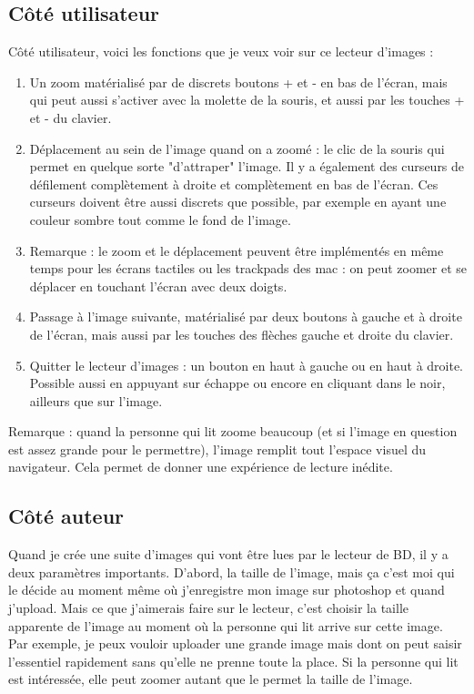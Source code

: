 \documentclass[french]{report}
\theoremstyle{plain}
\begin{document}
		\subsection{Côté utilisateur}
			Côté utilisateur, voici les fonctions que je veux voir sur ce lecteur d'images :
			\begin{enumerate}
				\item Un zoom matérialisé par de discrets boutons + et - en bas de l'écran, mais qui peut aussi s'activer avec la molette de la souris, et aussi par les touches + et - du clavier. 
				\item Déplacement au sein de l'image quand on a zoomé : le clic de la souris qui permet en quelque sorte "d'attraper" l'image. Il y a également des curseurs de défilement complètement à droite et complètement en bas de l'écran. Ces curseurs doivent être aussi discrets que possible, par exemple en ayant une couleur sombre tout comme le fond de l'image.
				\item Remarque : le zoom et le déplacement peuvent être implémentés en même temps pour les écrans tactiles ou les trackpads des mac : on peut zoomer et se déplacer en touchant l'écran avec deux doigts.
				\item Passage à l'image suivante, matérialisé par deux boutons à gauche et à droite de l'écran, mais aussi par les touches des flèches gauche et droite du clavier.
				\item Quitter le lecteur d'images : un bouton en haut à gauche ou en haut à droite. Possible aussi en appuyant sur échappe ou encore en cliquant dans le noir, ailleurs que sur l'image.
			\end{enumerate}
			Remarque : quand la personne qui lit zoome beaucoup (et si l'image en question est assez grande pour le permettre), l'image remplit tout l'espace visuel du navigateur. Cela permet de donner une expérience de lecture inédite. 

		\subsection{Côté auteur}
			Quand je crée une suite d'images qui vont être lues par le lecteur de BD, il y a deux paramètres importants. D'abord, la taille de l'image, mais ça c'est moi qui le décide au moment même où j'enregistre mon image sur photoshop et quand j'upload. Mais ce que j'aimerais faire sur le lecteur, c'est choisir la taille apparente de l'image au moment où la personne qui lit arrive sur cette image. Par exemple, je peux vouloir uploader une grande image mais dont on peut saisir l'essentiel rapidement sans qu'elle ne prenne toute la place. Si la personne qui lit est intéressée, elle peut zoomer autant que le permet la taille de l'image.
\end{document}
